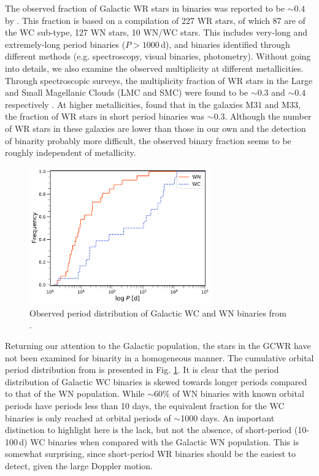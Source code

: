 The observed fraction of Galactic WR stars in binaries was reported to be ${\sim}0.4$ by  . This fraction is based on a compilation of 227 WR stars, of which 87 are of the WC sub-type, 127 WN stars, 10 WN/WC stars. This includes very-long and extremely-long period binaries ($P>1000\,$d), and binaries identified through different methods (e.g. spectroscopy, visual binaries, photometry). Without going into details, we also examine the observed multiplicity at different metallicities. Through spectroscopic surveys, the multiplicity fraction of WR stars in the Large and Small Magellanic Clouds (LMC and SMC) were found to be ${\sim}0.3$ and ${\sim}0.4$ respectively \citep{bartzakos_magellanic_2001,foellmi_wolf-rayet_2003,foellmi_wolf-rayet_2003-1,schnurr_spectroscopic_2008}. At higher metallicities, \citet{neugent_close_2014} found that in the galaxies M31 and M33, the fraction of WR stars in short period binaries was ${\sim}0.3$. Although the number of WR stars in these galaxies are lower than those in our own and the detection of binarity probably more difficult, the observed binary fraction seems to be roughly independent of metallicity. 


\begin{figure}
    \centering
    \includegraphics[width=0.7\textwidth]{chapters/introduction/image/Cumulative_pobs_withdust.pdf}
    \caption{Observed period distribution of Galactic WC and WN binaries from .}
    \label{fig:obs_pdist}
\end{figure}

Returning our attention to the Galactic population, the stars in the GCWR have not been examined for binarity in a homogeneous manner. The cumulative orbital period distribution from  is presented in Fig. \ref{fig:obs_pdist}. It is clear that the period distribution of Galactic WC binaries is skewed towards longer periods compared to that of the WN population. While ${\sim}60$\% of WN binaries with known orbital periods have periods less than 10 days, the equivalent fraction for the WC binaries is only reached at orbital periods of ${\sim}$1000 days. An important distinction to highlight here is the lack, but not the absence, of short-period (10-100\,d) WC binaries when compared with the Galactic WN population. This is somewhat surprising, since short-period WR binaries should be the easiest to detect, given the large Doppler motion. 

